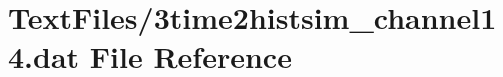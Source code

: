 \hypertarget{3time2histsim__channel14_8dat}{}\section{Text\+Files/3time2histsim\+\_\+channel14.dat File Reference}
\label{3time2histsim__channel14_8dat}
